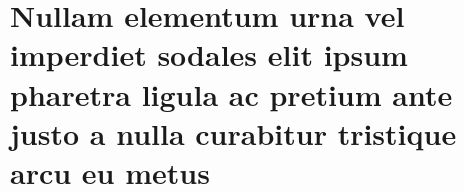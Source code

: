 %
%
%
%
%
\chapter{Nullam elementum urna vel imperdiet sodales elit ipsum pharetra ligula
	ac pretium ante justo a nulla curabitur tristique arcu eu metus}

\lipsum[55-57]